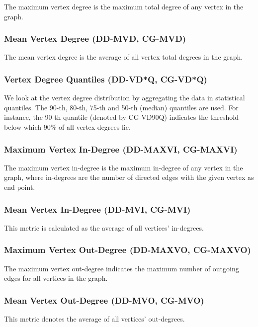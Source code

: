 The maximum vertex degree is the maximum total degree of any vertex in the
graph.

\subsubsection{Mean Vertex Degree (DD-MVD, CG-MVD)}

The mean vertex degree is the average of all vertex total degrees in the graph.

\subsubsection{Vertex Degree Quantiles (DD-VD*Q, CG-VD*Q)}

We look at the vertex degree distribution by aggregating the data in statistical
quantiles. The 90-th, 80-th, 75-th and 50-th (median) quantiles are used. For
instance, the 90-th quantile (denoted by CG-VD90Q) indicates the threshold
below which 90\% of all vertex degrees lie.

\subsubsection{Maximum Vertex In-Degree (DD-MAXVI, CG-MAXVI)}

The maximum vertex in-degree is the maximum in-degree of any vertex in the
graph, where in-degrees are the number of directed edges with the given vertex
as end point.

\subsubsection{Mean Vertex In-Degree (DD-MVI, CG-MVI)}

This metric is calculated as the average of all vertices' in-degrees.

\subsubsection{Maximum Vertex Out-Degree (DD-MAXVO, CG-MAXVO)}

The maximum vertex out-degree indicates the maximum number of outgoing edges for
all vertices in the graph.

\subsubsection{Mean Vertex Out-Degree (DD-MVO, CG-MVO)}

This metric denotes the average of all vertices' out-degrees.

